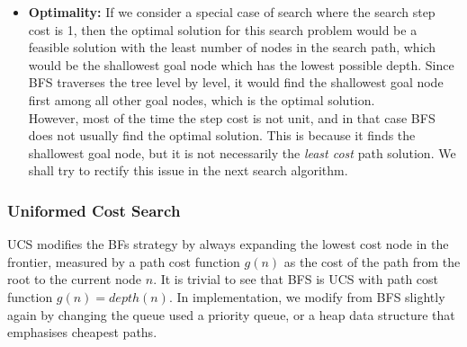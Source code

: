\documentclass[12pt]{article}
\begin{document}
\begin{itemize}
\item \textbf{Optimality:} If we consider a special case of search where the search step cost is 1, then the optimal solution for this search problem would be a feasible solution with the least number of nodes in the search path, which would be the shallowest goal node which has the lowest possible depth. Since BFS traverses the tree level by level, it would find the shallowest goal node first among all other goal nodes, which is the optimal solution.\\

However, most of the time the step cost is not unit, and in that case BFS does not usually find the optimal solution. This is because it finds the shallowest goal node, but it is not necessarily the \textit{least cost} path solution. We shall try to rectify this issue in the next search algorithm.
\end{itemize}

\subsubsection{Uniformed Cost Search}

UCS modifies the BFs strategy by always expanding the lowest cost node in the frontier, measured by a path cost function $g(n)$ as the cost of the path from the root to the current node $n$. It is trivial to see that BFS is UCS with path cost function $g(n) = depth(n)$. In implementation, we modify from BFS slightly again by changing the queue used a priority queue, or a heap data structure that emphasises cheapest paths.
\end{document}
